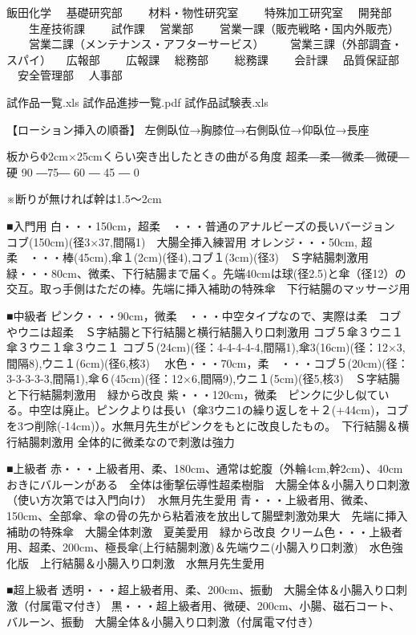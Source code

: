 飯田化学
　基礎研究部
　　材料・物性研究室
　　特殊加工研究室
　開発部
　　生産技術課
　　試作課
　営業部
　　営業一課（販売戦略・国内外販売）
　　営業二課（メンテナンス・アフターサービス）
　　営業三課（外部調査・スパイ）
　広報部
　　広報課
　総務部
　　総務課
　　会計課
　品質保証部
　安全管理部
　人事部





 試作品一覧.xls
 試作品進捗一覧.pdf
 試作品試験表.xls



【ローション挿入の順番】
左側臥位→胸膝位→右側臥位→仰臥位→長座

板からΦ2cm×25cmくらい突き出したときの曲がる角度
超柔―柔―微柔―微硬― 硬
 90 ―75― 60 ― 45 ― 0

※断りが無ければ幹は1.5～2cm

■入門用
白・・・150cm，超柔　・・・普通のアナルビーズの長いバージョン　コブ(150cm)(径3×37,間隔1)　大腸全挿入練習用
オレンジ・・・50cm, 超柔　・・・棒(45cm),傘１(2cm)(径4),コブ１(3cm)(径3)　Ｓ字結腸刺激用
緑・・・80cm、微柔、下行結腸まで届く。先端40cmは球(径2.5)と傘（径12）の交互。取っ手側はただの棒。先端に挿入補助の特殊傘　下行結腸のマッサージ用

■中級者
ピンク・・・90cm，微柔　・・・中空タイプなので、実際は柔　コブやウニは超柔　Ｓ字結腸と下行結腸と横行結腸入り口刺激用
コブ５傘３ウニ１傘３ウニ１傘３ウニ１
コブ５(24cm)(径：4-4-4-4-4,間隔1),傘3(16cm)(径：12×3,間隔8),ウニ１(6cm)(径6,核3)　
水色・・・70cm，柔　・・・コブ５(20cm)(径：3-3-3-3-3,間隔1),傘６(45cm)(径：12×6,間隔9),ウニ１(5cm)(径5,核3)　Ｓ字結腸と下行結腸刺激用　緑から改良
紫・・・120cm，微柔　ピンクに少し似ている。中空は廃止。ピンクよりは長い（傘3ウニ1の繰り返しを＋２(+44cm)，コブを3つ削除(-14cm)）。水無月先生がピンクをもとに改良したもの。　下行結腸＆横行結腸刺激用 全体的に微柔なので刺激は強力

■上級者
赤・・・上級者用、柔、180cm、通常は蛇腹（外輪4cm,幹2cm）、40cmおきにバルーンがある　全体は衝撃伝導性超柔樹脂　大腸全体＆小腸入り口刺激（使い方次第では入門向け）　水無月先生愛用
青・・・上級者用、微柔、150cm、全部傘、傘の骨の先から粘着液を放出して腸壁刺激効果大　先端に挿入補助の特殊傘　大腸全体刺激　夏美愛用　緑から改良
クリーム色・・・上級者用、超柔、200cm、極長傘(上行結腸刺激)＆先端ウニ(小腸入り口刺激)　水色強化版　上行結腸＆小腸入り口刺激　水無月先生愛用

■超上級者
透明・・・超上級者用、柔、200cm、振動　大腸全体＆小腸入り口刺激（付属電マ付き）
黒・・・超上級者用、微硬、200cm、小腸、磁石コート、バルーン、振動　大腸全体＆小腸入り口刺激（付属電マ付き）

